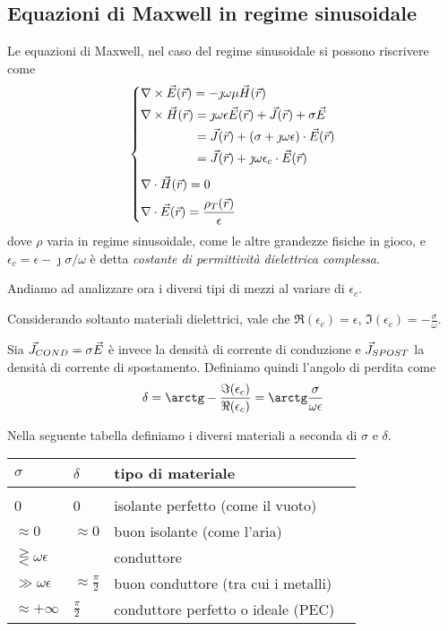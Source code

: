 \subsection{Equazioni di Maxwell in regime sinusoidale}
Le equazioni di Maxwell, nel caso del regime sinusoidale si possono riscrivere come
\begin{equation}\begin{dcases}
	\nabla\times\vec{E}(\vec{r}) = -\jmath \omega \mu\vec{H}(\vec{r}) \\
	\begin{aligned}[b]
		\nabla\times\vec{H}(\vec{r}) &= \jmath	\omega \epsilon \vec{E}(\vec{r}) + \vec{J}(\vec{r}) + \sigma\vec{E} \\
		&= \vec{J}(\vec{r}) +(\sigma + \jmath \omega \epsilon) \cdot \vec{E}(\vec{r}) \\
		&= \vec{J}(\vec{r}) +\jmath \omega \epsilon_c \cdot \vec{E}(\vec{r}) \\
	\end{aligned} \\
	\nabla\cdot\vec{H}(\vec{r})=0\\
	\nabla\cdot \vec{E}(\vec{r}) = \frac{\rho_T(\vec{r})}{\epsilon}
\end{dcases}\end{equation}
dove $\rho$ varia in regime sinusoidale, come le altre grandezze fisiche in gioco, e $\epsilon_c = \epsilon -\jmath\sigma / \omega$ è detta \emph{costante di permittività dielettrica complessa}.

Andiamo ad analizzare ora i diversi tipi di mezzi al variare di $\epsilon_c$.

\begin{definition}
	Considerando soltanto materiali dielettrici, vale che $\Re(\epsilon_c) = \epsilon$, $\Im(\epsilon_c) = -\frac{\sigma}{\omega}$.

	Sia $\vec{J}_{COND} = \sigma \vec{E}$ è invece la densità di corrente di conduzione e $\vec{J}_{SPOST}$ la densità di corrente di spostamento.
	Definiamo quindi l'angolo di perdita come
	\begin{equation}
		\delta = \arctg-\frac{\Im(\epsilon_c)}{\Re(\epsilon_c)} = \arctg\frac{\sigma}{\omega \epsilon}
		\end{equation}
\end{definition}

Nella seguente tabella definiamo i diversi materiali a seconda di $\sigma$ e $\delta$.
\begin{table}[h] \label{tab:conductors}
\centering
\begin{tabular}{llll}
	$\sigma$ & $\delta$ & tipo di materiale \\
	\hline \\
	0 & 0 & isolante perfetto (come il vuoto) \\
	$\approx 0$ & $\approx 0$ & buon isolante (come l'aria) \\
	$\gtreqless \omega \epsilon $ & & conduttore \\
	$\gg \omega \epsilon$ & $\approx \frac{\pi}{2}$ & buon conduttore (tra cui i metalli) \\
	$\approx +\infty$ & $\frac{\pi}{2}$ & conduttore perfetto o ideale (PEC)
\end{tabular}
\end{table}

